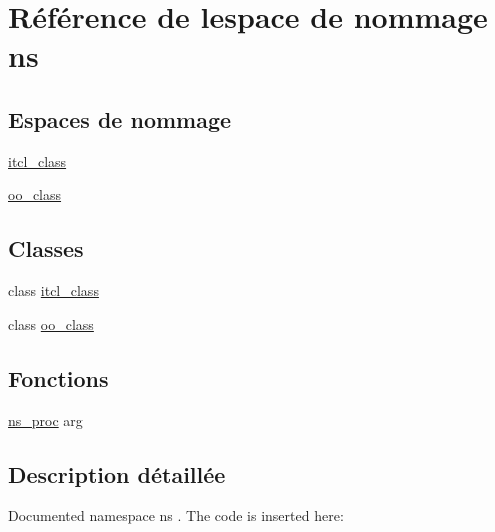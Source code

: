 \hypertarget{namespacens}{}\section{Référence de l\textquotesingle{}espace de nommage ns}
\label{namespacens}
\subsection*{Espaces de nommage}
\begin{DoxyCompactItemize}
\item 
 \hyperlink{namespacens_1_1itcl__class}{itcl\+\_\+class}
\item 
 \hyperlink{namespacens_1_1oo__class}{oo\+\_\+class}
\end{DoxyCompactItemize}
\subsection*{Classes}
\begin{DoxyCompactItemize}
\item 
class \hyperlink{classns_1_1itcl__class}{itcl\+\_\+class}
\item 
class \hyperlink{classns_1_1oo__class}{oo\+\_\+class}
\end{DoxyCompactItemize}
\subsection*{Fonctions}
\begin{DoxyCompactItemize}
\item 
\hyperlink{namespacens_a1429cbe84d32b17ea4783e5c5c00615b}{ns\+\_\+proc} arg
\end{DoxyCompactItemize}


\subsection{Description détaillée}
Documented namespace {\ttfamily ns} . The code is inserted here\+:


